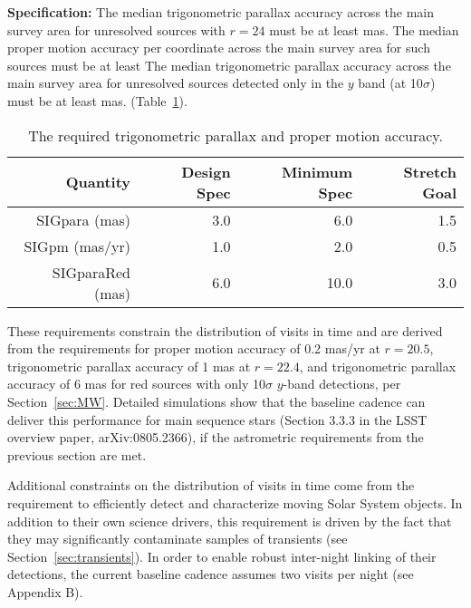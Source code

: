 {\bf Specification:} The median trigonometric parallax accuracy across the main
survey area for unresolved sources with $r=24$ must be at least
 mas.
The median proper motion accuracy per coordinate across the main
survey area for such sources must be at least
The median trigonometric parallax accuracy across the main survey area for unresolved
sources detected only in the $y$ band (at 10$\sigma$) must be at least
 mas.
(Table~\ref{TablePARAPM}).

\begin{table}[h]
\begin{tabular}{|r|r|r|r|}
\hline
Quantity                & Design Spec & Minimum Spec & Stretch Goal       \\
\hline
  SIGpara (mas)             &    3.0     &     6.0          &    1.5         \\
  SIGpm   (mas/yr)        &    1.0     &     2.0          &    0.5         \\
  SIGparaRed (mas)        &   6.0     &    10.0          &    3.0         \\
\hline
\end{tabular}
\caption{The required trigonometric parallax and proper motion accuracy.}
\label{TablePARAPM}
\end{table}

These requirements constrain the distribution of visits in time and are derived
from the requirements for proper motion accuracy of 0.2 mas/yr at $r=20.5$,
trigonometric parallax accuracy of 1 mas at $r=22.4$, and trigonometric parallax
accuracy of 6 mas for red sources with only 10$\sigma$ $y$-band detections, per
Section~\ref{sec:MW}. Detailed simulations show that the baseline cadence can deliver
this performance for main sequence stars (Section 3.3.3 in the LSST overview paper,
arXiv:0805.2366), if the astrometric requirements from the previous section are met.


Additional constraints on the distribution of visits in time come from
the requirement to efficiently detect and characterize moving Solar System
objects. In addition to their own science drivers, this requirement is driven
by the fact that they may significantly contaminate samples of transients
(see Section~\ref{sec:transients}).  In order to enable robust inter-night
linking of their detections, the current baseline cadence assumes two
visits per night  (see Appendix B).


